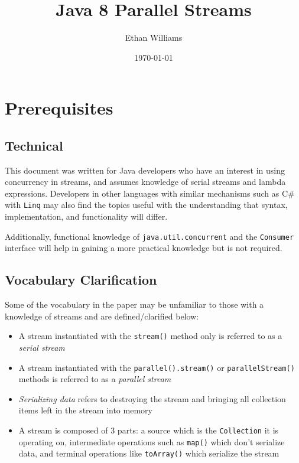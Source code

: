 \documentclass[oneside, 12pt]{article}
\begin{document}
\title{Java 8 Parallel Streams}
\author{Ethan Williams}
\date{\today}
\maketitle

\tableofcontents

\setcounter{section}{-1}
\section{Prerequisites}

\subsection{Technical}
This document was written for Java developers who have an interest in using concurrency in streams, and assumes knowledge of serial streams and lambda expressions. Developers in other languages with similar mechanisms such as C\# with \verb|Linq| may also find the topics useful with the understanding that syntax, implementation, and functionality will differ.

Additionally, functional knowledge of \verb|java.util.concurrent| and the \verb|Consumer| interface will help in gaining a more practical knowledge but is not required.

\subsection{Vocabulary Clarification} \label{language}
Some of the vocabulary in the paper may be unfamiliar to those with a knowledge of streams and are defined/clarified below:
\begin{itemize}
\item A stream instantiated with the \verb|stream()| method only is referred to as a \textit{serial stream}
\item A stream instantiated with the \verb|parallel().stream()| or \verb|parallelStream()| methods is referred to as a \textit{parallel stream}
\item \textit{Serializing data} refers to destroying the stream and bringing all collection items left in the stream into memory
\item A stream is composed of 3 parts: a source which is the \verb|Collection| it is operating on, intermediate operations such as \verb|map()| which don't serialize data, and terminal operations like \verb|toArray()| which serialize the stream
\end{itemize}
\end{document}
